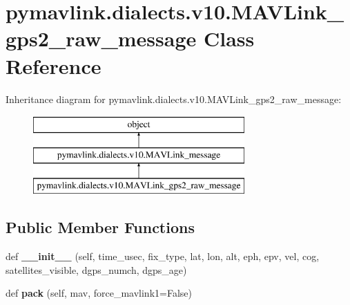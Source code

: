 \hypertarget{classpymavlink_1_1dialects_1_1v10_1_1MAVLink__gps2__raw__message}{}\section{pymavlink.\+dialects.\+v10.\+M\+A\+V\+Link\+\_\+gps2\+\_\+raw\+\_\+message Class Reference}
\label{classpymavlink_1_1dialects_1_1v10_1_1MAVLink__gps2__raw__message}
Inheritance diagram for pymavlink.\+dialects.\+v10.\+M\+A\+V\+Link\+\_\+gps2\+\_\+raw\+\_\+message\+:\begin{figure}[H]
\begin{center}
\leavevmode
\includegraphics[height=3.000000cm]{classpymavlink_1_1dialects_1_1v10_1_1MAVLink__gps2__raw__message}
\end{center}
\end{figure}
\subsection*{Public Member Functions}
\begin{DoxyCompactItemize}
\item 
\mbox{\label{classpymavlink_1_1dialects_1_1v10_1_1MAVLink__gps2__raw__message_a028621f9f3b4be851dfc4367698a21f5}} 
def {\bfseries \+\_\+\+\_\+init\+\_\+\+\_\+} (self, time\+\_\+usec, fix\+\_\+type, lat, lon, alt, eph, epv, vel, cog, satellites\+\_\+visible, dgps\+\_\+numch, dgps\+\_\+age)
\item 
\mbox{\label{classpymavlink_1_1dialects_1_1v10_1_1MAVLink__gps2__raw__message_aea2a5737dd64765f85c201dff350d539}} 
def {\bfseries pack} (self, mav, force\+\_\+mavlink1=False)
\end{DoxyCompactItemize}

